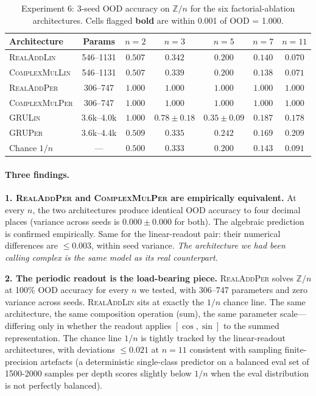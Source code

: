 \documentclass[11pt]{article}
\theoremstyle{definition}
\newcommand{\Z}{\mathbb{Z}}
\begin{document}
\begin{table}[h]
\centering
\caption{Experiment 6: 3-seed OOD accuracy on $\Z/n$ for the six
factorial-ablation architectures. Cells flagged \textbf{bold} are
within 0.001 of OOD = 1.000.}
\label{tab:exp6-results}
\setlength{\tabcolsep}{4pt}
\begin{tabular}{lcccccc}
\toprule
Architecture & Params & $n=2$ & $n=3$ & $n=5$ & $n=7$ & $n=11$ \\
\midrule
\textsc{RealAddLin}    & 546--1131 & $0.507$ & $0.342$ & $0.200$ & $0.140$ & $0.070$ \\
\textsc{ComplexMulLin} & 546--1131 & $0.507$ & $0.339$ & $0.200$ & $0.138$ & $0.071$ \\
\textsc{RealAddPer}    & 306--747  & $\mathbf{1.000}$ & $\mathbf{1.000}$ & $\mathbf{1.000}$ & $\mathbf{1.000}$ & $\mathbf{1.000}$ \\
\textsc{ComplexMulPer} & 306--747  & $\mathbf{1.000}$ & $\mathbf{1.000}$ & $\mathbf{1.000}$ & $\mathbf{1.000}$ & $\mathbf{1.000}$ \\
\textsc{GRULin}        & 3.6k--4.0k & $\mathbf{1.000}$ & $0.78 \pm 0.18$ & $0.35 \pm 0.09$ & $0.187$ & $0.178$ \\
\textsc{GRUPer}        & 3.6k--4.4k & $0.509$ & $0.335$ & $0.242$ & $0.169$ & $0.209$ \\
\midrule
Chance $1/n$           & ---       & $0.500$ & $0.333$ & $0.200$ & $0.143$ & $0.091$ \\
\bottomrule
\end{tabular}
\end{table}

\paragraph{Three findings.}

\textbf{1. \textsc{RealAddPer} and \textsc{ComplexMulPer} are
empirically equivalent.} At every $n$, the two architectures produce
identical OOD accuracy to four decimal places (variance across seeds
is $0.000 \pm 0.000$ for both). The algebraic prediction is
confirmed empirically. Same for the linear-readout pair: their
numerical differences are $\leq 0.003$, within seed variance.
\emph{The architecture we had been calling complex is the same model
as its real counterpart.}

\textbf{2. The periodic readout is the load-bearing piece.}
\textsc{RealAddPer} solves $\Z/n$ at 100\% OOD accuracy for every
$n$ we tested, with 306--747 parameters and zero variance across
seeds. \textsc{RealAddLin} sits at exactly the $1/n$ chance line.
The same architecture, the same composition operation (sum), the
same parameter scale---differing only in whether the readout
applies $[\cos, \sin]$ to the summed representation. The chance
line $1/n$ is tightly tracked by the linear-readout architectures,
with deviations $\leq 0.021$ at $n=11$ consistent with sampling
finite-precision artefacts (a deterministic single-class predictor
on a balanced eval set of 1500-2000 samples per depth scores
slightly below $1/n$ when the eval distribution is not perfectly
balanced).
\end{document}
